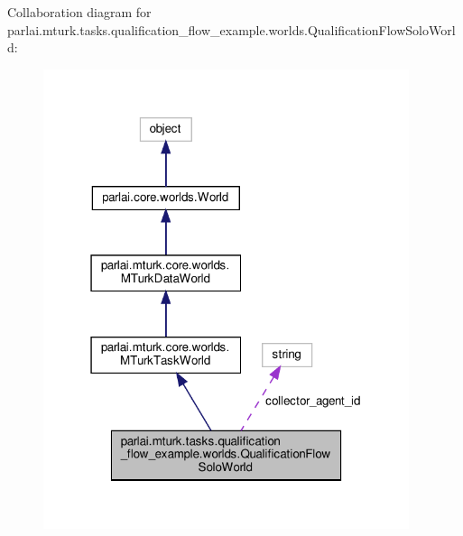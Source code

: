 Collaboration diagram for parlai.\+mturk.\+tasks.\+qualification\+\_\+flow\+\_\+example.\+worlds.\+Qualification\+Flow\+Solo\+World\+:
\nopagebreak
\begin{figure}[H]
\begin{center}
\leavevmode
\includegraphics[width=304pt]{classparlai_1_1mturk_1_1tasks_1_1qualification__flow__example_1_1worlds_1_1QualificationFlowSoloWorld__coll__graph}
\end{center}
\end{figure}
